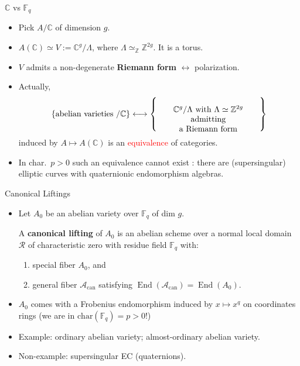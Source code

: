 \documentclass[usenames,dvipsnames]{beamer}
\def\Z{\mathbb{Z}}
\def\C{\mathbb{C}}
\def\F{\mathbb{F}}
\DeclareMathOperator{\End}{End}
\newcommand{\set}[1]{\left\lbrace#1\right\rbrace }
\newcommand{\Acan}{\mathcal{A}_{\mathrm{can}}}
\newcommand{\red}[1]{\textcolor{red}{#1}}
\begin{document}
\begin{frame}{ $\C$ vs $\F_q$ }    
    \begin{itemize}
     \item Pick $A/\C$ of dimension $g$. 
	 \pause \item $A(\C)\simeq V:=\C^g/\Lambda$, where $\Lambda\simeq_\Z\Z^{2g}$. It is a {torus}.
	 \pause \item $V$ admits a non-degenerate {\bf Riemann form} $\longleftrightarrow$ polarization.
	 \pause \item Actually,
	  \[
      \set{ \text{abelian varieties $/\C$} } \longleftrightarrow 
      \set{\parbox[c]{12.5em}{\center $\C^g/\Lambda$ with $\Lambda\simeq \Z^{2g}$ admitting\\ a Riemann form}}
     \]
	  induced by $ A \mapsto A(\C)$ is an \red{equivalence} of categories.
	 \pause \item In {char.~$p>0$} such an equivalence {cannot exist} : there are (supersingular) elliptic curves with quaternionic endomorphism algebras.
	\end{itemize}
\end{frame}

\begin{frame}{ Canonical Liftings } 
    \begin{itemize}
    \item Let $A_0$ be an abelian variety over $\F_q$ of dim $g$.
\pause
    \begin{definition}
	    A {\bf canonical lifting} of $A_0$ is an abelian scheme over a normal local domain $\mathcal{R}$ of characteristic zero with residue field $\F_q$ with:
	    \begin{enumerate}
	    \item special fiber $A_0$, and
	    \item general fiber $\Acan$ satisfying $\End(\Acan)= \End(A_0)$.
	    \end{enumerate}
    \end{definition}
\pause
    \item $A_0$ comes with a Frobenius endomorphism induced by $x\mapsto x^q$ on coordinates rings (we are in $\mathrm{char}(\F_q) =p>0$!)
\pause    
    \item Example: ordinary abelian variety; almost-ordinary abelian variety. 
\pause
    \item Non-example: supersingular EC (quaternions).
	\end{itemize}
\end{frame}
\end{document}
